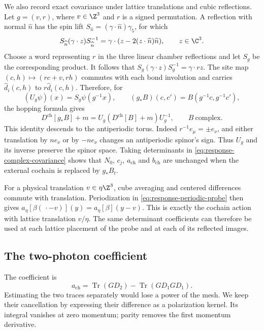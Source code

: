 \documentclass[11pt,letterpaper,reqno]{amsart}
\begin{document}
We also record exact covariance under lattice translations and cubic
reflections. Let $g=(v,r)$, where $v\in\Z^3$ and $r$ is a signed
permutation. A reflection with normal $\widehat n$ has the spin lift
$S_{\widehat n}=(\gamma\cdot\widehat n)\gamma_5$, for which
\[
 S_{\widehat n}(\gamma\cdot z)S_{\widehat n}^{-1}
       =\gamma\cdot(z-2(z\cdot\widehat n)\widehat n),
                         \qquad z\in\C^3.
\]
Choose a word representing $r$ in the three linear chamber
reflections and let $S_g$ be the corresponding product. It follows
that $S_g(\gamma\cdot z)S_g^{-1}=\gamma\cdot rz$.
The site map $(c,h)\mapsto(rc+v,rh)$ commutes with each bond
involution and carries $\widehat d_i(c,h)$ to
$r\widehat d_i(c,h)$. Therefore, for
\[
 (U_g\psi)(x)=S_g\psi(g^{-1}x),\qquad
 (g_*B)(c,c')=B(g^{-1}c,g^{-1}c'),
\]
the hopping formula gives
\begin{equation}\label{eq:response-complex-covariance}
 D^{\mathrm{ch}}[g_*B]+m
       =U_g(D^{\mathrm{ch}}[B]+m)U_g^{-1},
                                             \qquad B\ \text{complex}.
\end{equation}
This identity descends to the antiperiodic torus. Indeed
$r^{-1}e_\mu=\pm e_\nu$, and either translation by $ne_\nu$
or by $-ne_\nu$ changes an antiperiodic spinor's sign.
Thus $U_g$ and its inverse preserve the spinor space.
Taking determinants in \eqref{eq:response-complex-covariance}
shows that $N_0$, $c_j$, $a_{\mathrm{ch}}$ and $b_{\mathrm{ch}}$
are unchanged when the external cochain is replaced by $g_*B_t$.

For a physical translation $v\in\eta\Z^3$, cube averaging and
centered differences commute with translation. Periodization in
\eqref{eq:response-periodic-probe} then gives
$a_\eta[\beta(\,\cdot-v)](y)=a_\eta[\beta](y-v)$.
This is exactly the cochain action with lattice translation $v/\eta$.
The same determinant coefficients can therefore be used at each
lattice placement of the probe and at each of its reflected images.

\subsection{The two-photon coefficient}\label{subsec:response-polarization}

The coefficient is
\[
 a_{\mathrm{ch}}=\operatorname{Tr}(GD_2)-
                     \operatorname{Tr}(GD_1GD_1).
\]
Estimating the two traces separately would lose a power of the mesh.
We keep their cancellation by expressing their difference
as a polarization kernel. Its integral vanishes at zero momentum;
parity removes the first momentum derivative.
\end{document}
